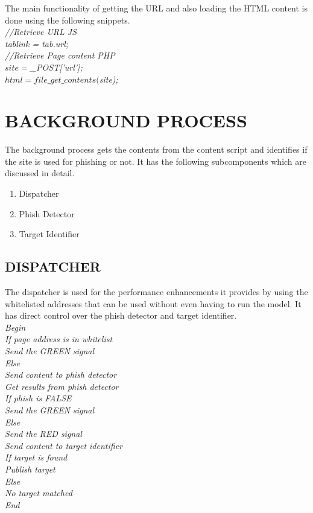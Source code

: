 The main functionality of getting the URL and also loading the HTML content is done using the following snippets.\\
\null\quad\textit{//Retrieve URL JS}\\
\null\quad\textit{tablink = tab.url;}\\
\null\quad\textit{//Retrieve Page content PHP}\\
\null\quad\textit{$site=$\_POST['url'];}\\
\null\quad\textit{$html = file\_get\_contents($site);}\\

\section{BACKGROUND PROCESS}
The background process gets the contents from the content script and identifies if the site is used for phishing or not. It has the following subcomponents which are discussed in detail.
\begin{enumerate}
    \item Dispatcher
    \item Phish Detector
    \item Target Identifier
\end{enumerate}

\subsection{DISPATCHER}
The dispatcher is used for the performance enhancements it provides by using the whitelisted addresses that can be used without even having to run the model. It has direct control over the phish detector and target identifier.\\
\null\quad\textit{Begin}\\
\null\quad\quad\textit{If page address is in whitelist}\\
\null\quad\quad\quad\textit{Send the GREEN signal}\\
\null\quad\quad\textit{Else}\\
\null\quad\quad\quad\textit{Send content to phish detector}\\
\null\quad\quad\quad\textit{Get results from phish detector}\\
\null\quad\quad\quad\textit{If phish is FALSE}\\
\null\quad\quad\quad\quad\textit{Send the GREEN signal}\\
\null\quad\quad\quad\textit{Else}\\
\null\quad\quad\quad\quad\quad\textit{Send the RED signal}\\
\null\quad\quad\quad\quad\quad\textit{Send  content to target identifier}\\
\null\quad\quad\quad\quad\quad\textit{If target is found}\\
\null\quad\quad\quad\quad\quad\quad\textit{Publish target}\\
\null\quad\quad\quad\quad\quad\textit{Else}\\
\null\quad\quad\quad\quad\quad\quad\textit{No target matched}\\
\null\quad\textit{End}\\

